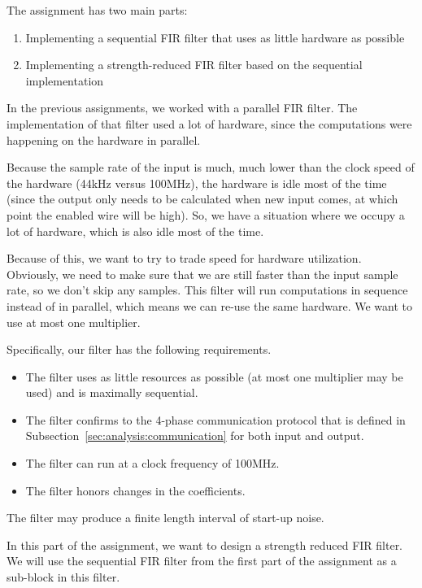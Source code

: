 
The assignment has two main parts:
\begin{enumerate}
	\item Implementing a sequential FIR filter that uses as little hardware as possible
	\item Implementing a strength-reduced FIR filter based on the sequential implementation
\end{enumerate}

\seqfilter
In the previous assignments, we worked with a parallel FIR filter.
The implementation of that filter used a lot of hardware, since the computations were happening on the hardware in parallel.

Because the sample rate of the input is much, much lower than the clock speed of the hardware (44kHz versus 100MHz), the hardware is idle most of the time (since the output only needs to be calculated when new input comes, at which point the enabled wire will be high).
So, we have a situation where we occupy a lot of hardware, which is also idle most of the time.

Because of this, we want to try to trade speed for hardware utilization.
Obviously, we need to make sure that we are still faster than the input sample rate, so we don't skip any samples.
This filter will run computations in sequence instead of in parallel, which means we can re-use the same hardware.
We want to use at most one multiplier.

Specifically, our filter has the following requirements.

\begin{itemize}
	\item The filter uses as little resources as possible (at most one multiplier may be used) and is maximally sequential.
	\item The filter confirms to the 4-phase communication protocol that is defined in Subsection~\ref{sec:analysis:communication} for both input and output.
	\item The filter can run at a clock frequency of 100MHz.
	\item The filter honors changes in the coefficients.
\end{itemize}

The filter may produce a finite length interval of start-up noise.

\strengthfilter
In this part of the assignment, we want to design a strength reduced FIR filter.
We will use the sequential FIR filter from the first part of the assignment as a sub-block in this filter.

